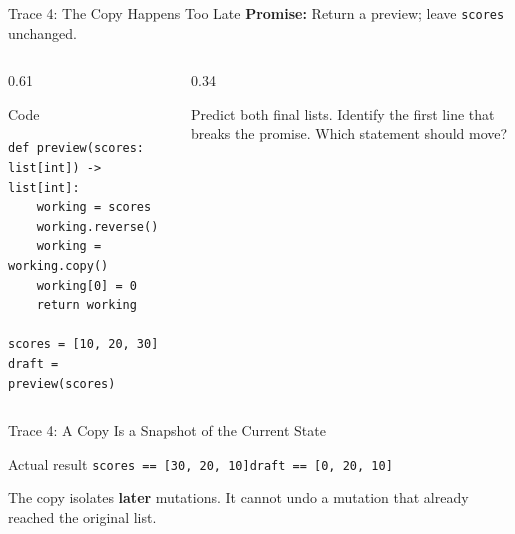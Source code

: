 \documentclass[aspectratio=169,10pt]{beamer}
\begin{document}

\begin{frame}[fragile]{Trace 4: The Copy Happens Too Late}
  \textbf{Promise:} Return a preview; leave \texttt{scores} unchanged.
  \begin{columns}[T,onlytextwidth]
    \begin{column}{0.61\textwidth}
  \begin{block}{Code}
\begin{verbatim}
def preview(scores: list[int]) -> list[int]:
    working = scores
    working.reverse()
    working = working.copy()
    working[0] = 0
    return working

scores = [10, 20, 30]
draft = preview(scores)
\end{verbatim}
  \end{block}
    \end{column}
    \begin{column}{0.34\textwidth}
  \begin{activity}
    Predict both final lists. Identify the first line that breaks the promise. Which statement should move?
  \end{activity}
    \end{column}
  \end{columns}
\end{frame}

\begin{frame}{Trace 4: A Copy Is a Snapshot of the Current State}
  \begin{center}
    \resizebox{0.88\linewidth}{!}{\copytimingdiagram}
  \end{center}
  \begin{block}{Actual result}
    \texttt{scores == [30, 20, 10]}\qquad \texttt{draft == [0, 20, 10]}
  \end{block}
  The copy isolates \textbf{later} mutations. It cannot undo a mutation that already reached the original list.
\end{frame}
\end{document}
